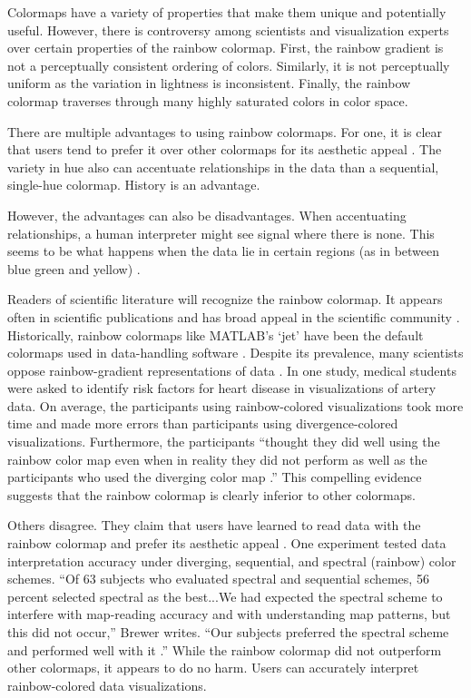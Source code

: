 \documentclass[journal,12pt]{IEEEtran}
\begin{document}
Colormaps have a variety of properties that make them unique and potentially
useful. However, there is controversy among scientists and visualization
experts over certain properties of the rainbow colormap. First, the rainbow
gradient is not a perceptually consistent ordering of colors. Similarly, it
is not perceptually uniform as the variation in lightness is inconsistent.
Finally, the rainbow colormap traverses through many
highly saturated colors in color space.


There are multiple advantages to using rainbow colormaps. For one,
it is clear that users tend to prefer it
over other colormaps for its aesthetic appeal
\cite{spectralschemes, choropleth, endofrainbow}. 
The variety in hue also can accentuate relationships in the data than
a sequential, single-hue colormap. History is an advantage.
\par
However, the advantages can also be disadvantages.
When accentuating relationships, a human interpreter
might see signal where there is none. This seems to be
what happens when the data lie in certain regions (as in
between blue green and yellow) \cite{colorchoice}.
\par
Readers of scientific literature will recognize the rainbow colormap. 
It appears often in scientific publications and has 
broad appeal in the scientific community
\cite{endofrainbow, rainbowstill, spectralschemes,choropleth}.
 Historically, rainbow colormaps like
MATLAB’s ‘jet’ have been the default colormaps used
in data-handling software \cite{matlab}. Despite its prevalence, 
many scientists oppose rainbow-gradient representations of data
\cite{rainbowstill, endofrainbow, viridis,arteryvis}.
 In one study, medical students were
asked to identify risk factors for heart disease in visualizations
of artery data. On average, the participants
using rainbow-colored visualizations took more time
and made more errors than participants using divergence-colored visualizations. 
Furthermore, the participants “thought they did well using the rainbow color
map even when in reality they did not perform as well
as the participants who used the diverging color map
\cite{arteryvis}.” This compelling evidence suggests
that the rainbow colormap is clearly inferior to other
colormaps.
\par
Others disagree. They claim that users have learned to
read data with the rainbow colormap and prefer its
aesthetic appeal \cite{spectralschemes, choropleth}. One
experiment tested data interpretation accuracy under
diverging, sequential, and spectral (rainbow) color
schemes. “Of 63 subjects who evaluated spectral and
sequential schemes, 56 percent selected spectral as the
best...We had expected the spectral scheme to interfere
with map-reading accuracy and with understanding
map patterns, but this did not occur,” Brewer writes.
“Our subjects preferred the spectral scheme
and performed well with it \cite{spectralschemes}.”
 While the rainbow colormap did not outperform other colormaps, it
appears to do no harm. Users can accurately interpret
rainbow-colored data visualizations.
\end{document}
